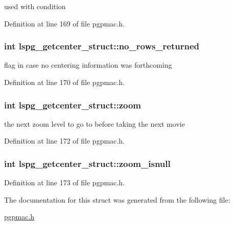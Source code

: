 used with condition 



Definition at line 169 of file pgpmac.\-h.

\hypertarget{structlspg__getcenter__struct_aaeb0ccf4289b4fb306c2bc04ae85b237}{
\subsubsection[{no\-\_\-rows\-\_\-returned}]{\setlength{\rightskip}{0pt plus 5cm}int lspg\-\_\-getcenter\-\_\-struct\-::no\-\_\-rows\-\_\-returned}}\label{structlspg__getcenter__struct_aaeb0ccf4289b4fb306c2bc04ae85b237}


flag in case no centering information was forthcoming 



Definition at line 170 of file pgpmac.\-h.

\hypertarget{structlspg__getcenter__struct_a63e640a925611d2404a1529aea30a853}{
\subsubsection[{zoom}]{\setlength{\rightskip}{0pt plus 5cm}int lspg\-\_\-getcenter\-\_\-struct\-::zoom}}\label{structlspg__getcenter__struct_a63e640a925611d2404a1529aea30a853}


the next zoom level to go to before taking the next movie 



Definition at line 172 of file pgpmac.\-h.

\hypertarget{structlspg__getcenter__struct_a6ca85a8de29039188357b2814acd7803}{
\subsubsection[{zoom\-\_\-isnull}]{\setlength{\rightskip}{0pt plus 5cm}int lspg\-\_\-getcenter\-\_\-struct\-::zoom\-\_\-isnull}}\label{structlspg__getcenter__struct_a6ca85a8de29039188357b2814acd7803}


Definition at line 173 of file pgpmac.\-h.



The documentation for this struct was generated from the following file\-:\begin{DoxyCompactItemize}
\item 
\hyperlink{pgpmac_8h}{pgpmac.\-h}\end{DoxyCompactItemize}
